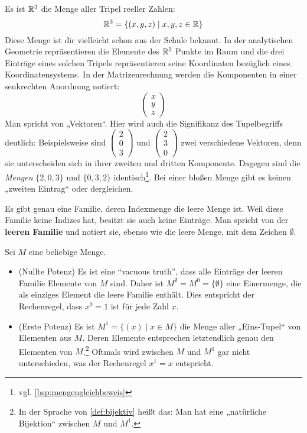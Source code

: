 \begin{bsp}
    Es ist $\mathbb R^3$ die Menge aller Tripel reeller Zahlen:
        \[ \mathbb R^3 = \{(x,y,z) \mid x,y,z\in \mathbb R \} \]
    Diese Menge ist dir vielleicht schon aus der Schule bekannt. In der analytischen Geometrie repräsentieren die Elemente des $\mathbb R^3$ Punkte im Raum und die drei Einträge eines solchen Tripels repräsentieren seine Koordinaten bezüglich eines Koordinatensystems. In der Matrizenrechnung werden die Komponenten in einer senkrechten Anordnung notiert:
    \[\begin{pmatrix}
        x \\ y \\ z 
    \end{pmatrix} \]
    Man spricht von „Vektoren“. Hier wird auch die Signifikanz des Tupelbegriffs deutlich: Beispielsweise sind $\begin{pmatrix} 2 \\ 0 \\ 3 \end{pmatrix}$ und $\begin{pmatrix} 2 \\ 3 \\ 0 \end{pmatrix}$ zwei verschiedene Vektoren, denn sie unterscheiden sich in ihrer zweiten und dritten Komponente. Dagegen sind die \emph{Mengen} $\{2,0,3\}$ und $\{0,3,2\}$ identisch\footnote{vgl. \cref{bsp:mengengleichbeweis}}. Bei einer bloßen Menge gibt es keinen „zweiten Eintrag“ oder dergleichen.
\end{bsp}


\begin{de} \label{def:leerefam}
    Es gibt genau eine Familie, deren Indexmenge die leere Menge ist. Weil diese Familie keine Indizes hat, besitzt sie auch keine Einträge. Man spricht von der \textbf{leeren Familie} und notiert sie, ebenso wie die leere Menge, mit dem Zeichen $\emptyset$.
\end{de}


\begin{bem}
    Sei $M$ eine beliebige Menge.
    \begin{itemize}
        \item(Nullte Potenz) Es ist eine ``vacuous truth'', dass alle Einträge der leeren Familie Elemente von $M$ sind. Daher ist $M^\emptyset=M^0 = \{\emptyset\}$ eine Einermenge, die als einziges Element die leere Familie enthält. Dies entspricht der Rechenregel, dass $x^0=1$ ist für jede Zahl $x$.
        \item(Erste Potenz) Es ist $M^1 = \{(x)\mid x\in M\}$ die Menge aller „Eins-Tupel“ von Elementen aus $M$. Deren Elemente entsprechen letztendlich genau den Elementen von $M$.\footnote{In der Sprache von \cref{def:bijektiv} heißt das: Man hat eine „natürliche Bijektion“ zwischen $M$ und $M^1$.} Oftmals wird zwischen $M$ und $M^1$ gar nicht unterschieden, was der Rechenregel $x^1=x$ entspricht.
    \end{itemize}
\end{bem}






